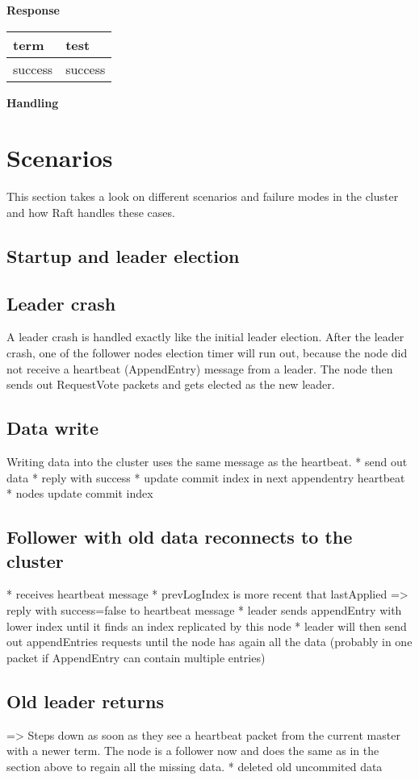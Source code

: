 \textbf{Response}

\begin{tabular}{ | l | p{13.7cm} | }
\hline
term & test \\ \hline
success & success \\ \hline
\end{tabular}

\textbf{Handling}

\section{Scenarios}
This section takes a look on different scenarios and failure modes in the cluster and how Raft handles these cases.

\subsection{Startup and leader election}

\subsection{Leader crash}
A leader crash is handled exactly like the initial leader election.
After the leader crash, one of the follower nodes election timer will run out, because the node did not receive a heartbeat (AppendEntry) message from a leader. The node then sends out 
RequestVote packets and gets elected as the new leader.

\subsection{Data write}
Writing data into the cluster uses the same message as the heartbeat.
* send out data
* reply with success
* update commit index in next appendentry heartbeat
* nodes update commit index

\subsection{Follower with old data reconnects to the cluster}
* receives heartbeat message
* prevLogIndex is more recent that lastApplied => reply with success=false to heartbeat message
* leader sends appendEntry with lower index until it finds an index replicated by this node
* leader will then send out appendEntries requests until the node has again all the data (probably in one packet if AppendEntry can contain multiple entries)

\subsection{Old leader returns}
=> Steps down as soon as they see a heartbeat packet from the current master with a newer term.
The node is a follower now and does the same as in the section above to regain all the missing data.
* deleted old uncommited data


